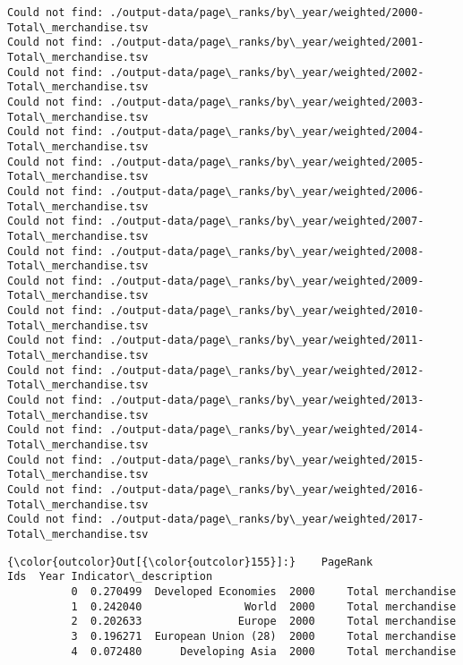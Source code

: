 \documentclass[11pt]{article}
\begin{document}
    \begin{Verbatim}[commandchars=\\\{\}]
Could not find: ./output-data/page\_ranks/by\_year/weighted/2000-Total\_merchandise.tsv
Could not find: ./output-data/page\_ranks/by\_year/weighted/2001-Total\_merchandise.tsv
Could not find: ./output-data/page\_ranks/by\_year/weighted/2002-Total\_merchandise.tsv
Could not find: ./output-data/page\_ranks/by\_year/weighted/2003-Total\_merchandise.tsv
Could not find: ./output-data/page\_ranks/by\_year/weighted/2004-Total\_merchandise.tsv
Could not find: ./output-data/page\_ranks/by\_year/weighted/2005-Total\_merchandise.tsv
Could not find: ./output-data/page\_ranks/by\_year/weighted/2006-Total\_merchandise.tsv
Could not find: ./output-data/page\_ranks/by\_year/weighted/2007-Total\_merchandise.tsv
Could not find: ./output-data/page\_ranks/by\_year/weighted/2008-Total\_merchandise.tsv
Could not find: ./output-data/page\_ranks/by\_year/weighted/2009-Total\_merchandise.tsv
Could not find: ./output-data/page\_ranks/by\_year/weighted/2010-Total\_merchandise.tsv
Could not find: ./output-data/page\_ranks/by\_year/weighted/2011-Total\_merchandise.tsv
Could not find: ./output-data/page\_ranks/by\_year/weighted/2012-Total\_merchandise.tsv
Could not find: ./output-data/page\_ranks/by\_year/weighted/2013-Total\_merchandise.tsv
Could not find: ./output-data/page\_ranks/by\_year/weighted/2014-Total\_merchandise.tsv
Could not find: ./output-data/page\_ranks/by\_year/weighted/2015-Total\_merchandise.tsv
Could not find: ./output-data/page\_ranks/by\_year/weighted/2016-Total\_merchandise.tsv
Could not find: ./output-data/page\_ranks/by\_year/weighted/2017-Total\_merchandise.tsv

    \end{Verbatim}

\begin{Verbatim}[commandchars=\\\{\}]
{\color{outcolor}Out[{\color{outcolor}155}]:}    PageRank                  Ids  Year Indicator\_description
          0  0.270499  Developed Economies  2000     Total merchandise
          1  0.242040                World  2000     Total merchandise
          2  0.202633               Europe  2000     Total merchandise
          3  0.196271  European Union (28)  2000     Total merchandise
          4  0.072480      Developing Asia  2000     Total merchandise
\end{Verbatim}
            
\end{document}
